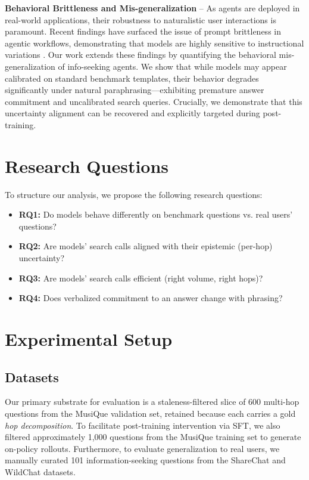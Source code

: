 \documentclass[10pt, letterpaper]{article}
\begin{document}
\textbf{Behavioral Brittleness and Mis-generalization} -- As agents are deployed in real-world applications, their robustness to naturalistic user interactions is paramount. Recent findings have surfaced the issue of prompt brittleness in agentic workflows, demonstrating that models are highly sensitive to instructional variations \cite{jang_how_2026, rabinovich_robustness_2025}. Our work extends these findings by quantifying the behavioral mis-generalization of info-seeking agents. We show that while models may appear calibrated on standard benchmark templates, their behavior degrades significantly under natural paraphrasing---exhibiting premature answer commitment and uncalibrated search queries. Crucially, we demonstrate that this uncertainty alignment can be recovered and explicitly targeted during post-training.
\section{Research Questions}
To structure our analysis, we propose the following research questions:
\begin{itemize}
    \item \textbf{RQ1:} Do models behave differently on benchmark questions vs. real users' questions?
    \item \textbf{RQ2:} Are models' search calls aligned with their epistemic (per-hop) uncertainty?
    \item \textbf{RQ3:} Are models' search calls efficient (right volume, right hops)?
    \item \textbf{RQ4:} Does verbalized commitment to an answer change with phrasing?
\end{itemize}

\section{Experimental Setup}

\subsection{Datasets}
Our primary substrate for evaluation is a staleness-filtered slice of 600 multi-hop questions from the MusiQue \citep{trivedi__2022} validation set, retained because each carries a gold \emph{hop decomposition}. To facilitate post-training intervention via SFT, we also filtered approximately 1,000 questions from the MusiQue training set to generate on-policy rollouts. Furthermore, to evaluate generalization to real users, we manually curated 101 information-seeking questions from the ShareChat and WildChat datasets.
\end{document}
